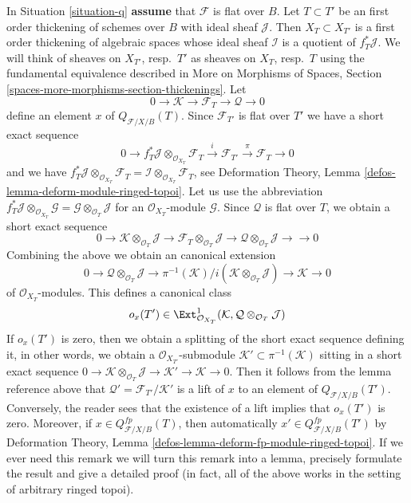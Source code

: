 \begin{remark}
\label{remark-q-obs}
In Situation \ref{situation-q} {\bf assume} that $\mathcal{F}$ is flat
over $B$. Let $T \subset T'$ be an first order
thickening of schemes over $B$ with ideal sheaf $\mathcal{J}$. Then
$X_T \subset X_{T'}$ is a first order thickening of algebraic spaces
whose ideal sheaf $\mathcal{I}$ is a quotient of $f_T^*\mathcal{J}$.
We will think of sheaves on $X_{T'}$, resp.\ $T'$ as sheaves on
$X_T$, resp.\ $T$ using the fundamental equivalence described in
More on Morphisms of Spaces, Section
\ref{spaces-more-morphisms-section-thickenings}.
Let
$$
0 \to \mathcal{K} \to \mathcal{F}_T \to \mathcal{Q} \to 0
$$
define an element $x$ of $Q_{\mathcal{F}/X/B}(T)$. Since $\mathcal{F}_{T'}$
is flat over $T'$ we have a short exact sequence
$$
0 \to f_T^*\mathcal{J} \otimes_{\mathcal{O}_{X_T}} \mathcal{F}_T
\xrightarrow{i} \mathcal{F}_{T'} \xrightarrow{\pi} \mathcal{F}_T \to 0
$$
and we have
$f_T^*\mathcal{J} \otimes_{\mathcal{O}_{X_T}} \mathcal{F}_T =
\mathcal{I} \otimes_{\mathcal{O}_{X_T}} \mathcal{F}_T$, see
Deformation Theory, Lemma \ref{defos-lemma-deform-module-ringed-topoi}.
Let us use the abbreviation
$
f_T^*\mathcal{J} \otimes_{\mathcal{O}_{X_T}} \mathcal{G} =
\mathcal{G} \otimes_{\mathcal{O}_T} \mathcal{J}
$
for an $\mathcal{O}_{X_T}$-module $\mathcal{G}$.
Since $\mathcal{Q}$ is flat over $T$, we obtain a short exact sequence
$$
0 \to
\mathcal{K} \otimes_{\mathcal{O}_T} \mathcal{J} \to
\mathcal{F}_T \otimes_{\mathcal{O}_T} \mathcal{J} \to
\mathcal{Q} \otimes_{\mathcal{O}_T} \mathcal{J} \to
\to 0
$$
Combining the above we obtain an canonical extension
$$
0 \to \mathcal{Q} \otimes_{\mathcal{O}_T} \mathcal{J} \to
\pi^{-1}(\mathcal{K})/i(\mathcal{K} \otimes_{\mathcal{O}_T} \mathcal{J}) \to
\mathcal{K} \to 0
$$
of $\mathcal{O}_{X_T}$-modules. This defines a canonical class
$$
o_x(T') \in
\Ext^1_{\mathcal{O}_{X_T}}(\mathcal{K},
\mathcal{Q} \otimes_{\mathcal{O}_T} \mathcal{J})
$$
If $o_x(T')$ is zero, then we obtain a splitting of the short
exact sequence defining it, in other words, we obtain a
$\mathcal{O}_{X_{T'}}$-submodule
$\mathcal{K}' \subset \pi^{-1}(\mathcal{K})$ sitting in a short
exact sequence
$0 \to \mathcal{K} \otimes_{\mathcal{O}_T} \mathcal{J} \to
\mathcal{K}' \to \mathcal{K} \to 0$.
Then it follows from the lemma reference above that
$\mathcal{Q}' = \mathcal{F}_{T'}/\mathcal{K}'$
is a lift of $x$ to an element of $Q_{\mathcal{F}/X/B}(T')$.
Conversely, the reader sees that the existence of
a lift implies that $o_x(T')$ is zero. Moreover, if
$x \in Q_{\mathcal{F}/X/B}^{fp}(T)$, then automatically
$x' \in Q_{\mathcal{F}/X/B}^{fp}(T')$ by
Deformation Theory, Lemma \ref{defos-lemma-deform-fp-module-ringed-topoi}.
If we ever need this
remark we will turn this remark into a lemma, precisely formulate
the result and give a detailed proof (in fact, all of the above
works in the setting of arbitrary ringed topoi).
\end{remark}


